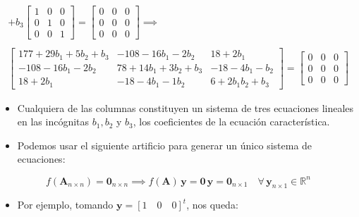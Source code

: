 \documentclass[openany]{book}
\providecommand{\tightlist}{%
  \setlength{\itemsep}{0pt}\setlength{\parskip}{0pt}}
\begin{document}
\begin{gather*}
+ b_3
\begin{bmatrix} 
    1 & 0 & 0 \\ 
    0 & 1 & 0 \\
    0 & 0 & 1    
\end{bmatrix} =
\begin{bmatrix} 
    0 & 0 & 0 \\ 
    0 & 0 & 0 \\
    0 & 0 & 0    
\end{bmatrix}
\implies \\ \\
\begin{bmatrix}        
    177 + 29 b_1 + 5 b_2 + b_3 &   -108-16  b_1 -2  b_2       &  18 +2  b_1              \\ 
    -108 -16  b_1 -2  b_2      &  78  + 14 b_1 + 3 b_2 + b_3  &   -18 -4  b_1 -  b_2     \\
    18+2  b_1                  &   -18 -4  b_1 -1  b_2        &   6 + 2 b_1   b_2 + b_3
\end{bmatrix} =
\begin{bmatrix} 
    0 & 0 & 0 \\ 
    0 & 0 & 0 \\
    0 & 0 & 0    
\end{bmatrix}
\end{gather*}

\begin{itemize}
\item
  Cualquiera de las columnas constituyen un sistema de tres ecuaciones lineales en las incógnitas \(b_1, b_2\) y \(b_3\), los coeficientes de la ecuación característica.
\item
  Podemos usar el siguiente artificio para generar un único sistema de ecuaciones:
\end{itemize}

\[
f(\textbf{A}_{n\times n}) = \textbf{0}_{n\times n} \implies f(\textbf{A})  \, \textbf{y}= \textbf{0}\, \textbf{y}  = \textbf{0}_{n\times 1}  \quad \forall \, \textbf{y}_{n\times 1} \in \mathbb{R}^n
\]

\begin{itemize}
\tightlist
\item
  Por ejemplo, tomando \(\textbf{y} = [1 \quad 0 \quad 0]^t\), nos queda:
\end{itemize}
\end{document}
